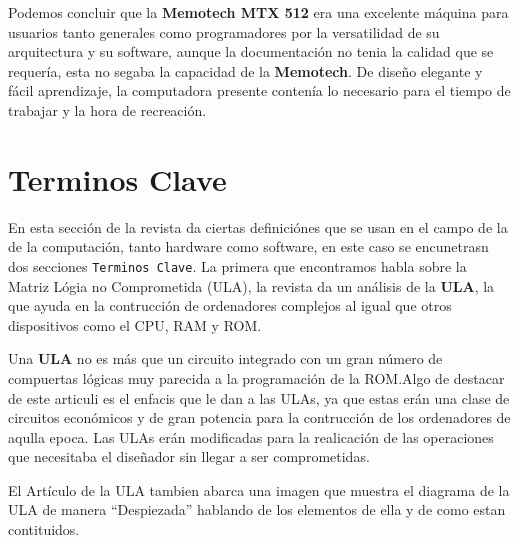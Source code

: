 \documentclass{article}
\begin{document}
\begin{multicols}{2}
Podemos concluir que la \textbf{Memotech MTX 512} era una excelente máquina para usuarios tanto generales como
programadores por la versatilidad de su arquitectura y su software, aunque la documentación no tenia la
calidad que se requería, esta no segaba la capacidad de la \textbf{Memotech}. De diseño elegante y fácil
aprendizaje, la computadora presente contenía lo necesario para el tiempo de trabajar y la hora de recreación.

\section{Terminos Clave}

En esta sección de la revista da ciertas definiciónes que se usan en el campo
de la de la computación, tanto hardware como software, en este caso se
encunetrasn dos secciones \texttt{Terminos Clave}. La primera que encontramos
habla sobre la Matriz Lógia no Comprometida (ULA), la revista da un análisis de
la \textbf{ULA}, la que ayuda en la contrucción de ordenadores complejos al
igual que otros dispositivos como el CPU, RAM y ROM.\@

Una \textbf{ULA} no es más que un circuito integrado con un gran número de
compuertas lógicas muy parecida a la programación de la ROM.\@ Algo de destacar
de este articuli es el enfacis que le dan a las ULAs, ya que estas erán una
clase de circuitos económicos y de gran potencia para la contrucción de los
ordenadores de aqulla epoca. Las ULAs erán modificadas para la realicación de
las operaciones que necesitaba el diseñador sin llegar a ser comprometidas.\@


El Artículo de la ULA tambien abarca una imagen que muestra el diagrama de la
ULA de manera ``Despiezada'' hablando de los elementos de ella y de como
estan contituidos. 






  
\end{multicols}
\end{document}

